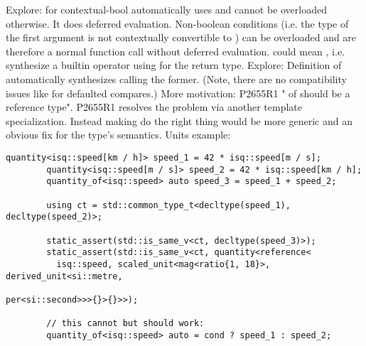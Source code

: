 \begin{revision}
  \todo Explore:  for contextual-bool automatically uses  and cannot be overloaded otherwise.
        It does deferred evaluation.
        Non-boolean conditions (i.e. the type of the first argument is not contextually convertible to \bool) can be overloaded and are therefore a normal function call without deferred evaluation.
  \todo {} could mean , i.e. synthesize a builtin operator using  for the return type.
  \todo Explore: Definition of  automatically synthesizes  calling the former.
        (Note, there are no compatibility issues like for defaulted compares.)
  \todo More motivation: P2655R1 " of  should be a reference type".
        P2655R1 resolves the problem via another template specialization. Instead making  do the right thing would be more generic and an obvious fix for the type's semantics.
        \todo Units example:
        \begin{lstlisting}[style=Vc]
        quantity<isq::speed[km / h]> speed_1 = 42 * isq::speed[m / s];
        quantity<isq::speed[m / s]> speed_2 = 42 * isq::speed[km / h];
        quantity_of<isq::speed> auto speed_3 = speed_1 + speed_2;

        using ct = std::common_type_t<decltype(speed_1), decltype(speed_2)>;

        static_assert(std::is_same_v<ct, decltype(speed_3)>);
        static_assert(std::is_same_v<ct, quantity<reference<
          isq::speed, scaled_unit<mag<ratio{1, 18}>, derived_unit<si::metre,
                                                       per<si::second>>>{}>{}>>);

        // this cannot but should work:
        quantity_of<isq::speed> auto = cond ? speed_1 : speed_2;
        \end{lstlisting}
\end{revision}

